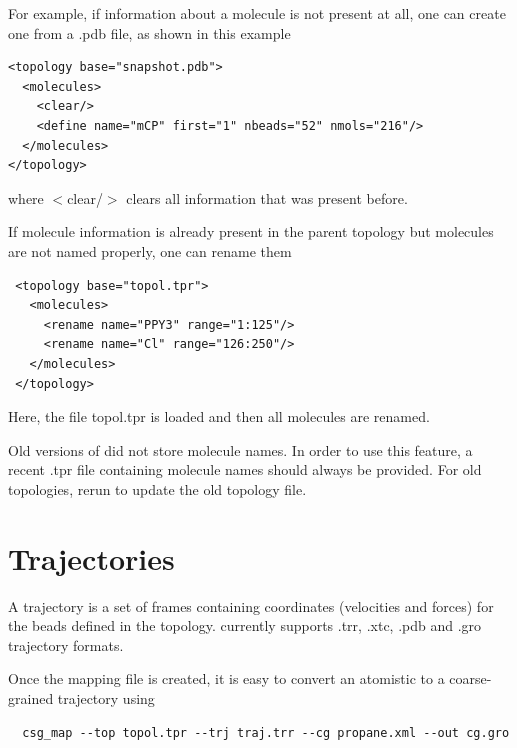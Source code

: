 For example, if information about a molecule is not present at all, one can create one from a .pdb file, as shown in this example
\begin{lstlisting}
<topology base="snapshot.pdb">
  <molecules>
    <clear/>
    <define name="mCP" first="1" nbeads="52" nmols="216"/>
  </molecules>
</topology>
\end{lstlisting}
where $<$clear/$>$ clears all information that was present before.

If molecule information is already present in the parent topology but molecules are not named properly, one can rename them
\begin{lstlisting}
 <topology base="topol.tpr">
   <molecules>
     <rename name="PPY3" range="1:125"/>
     <rename name="Cl" range="126:250"/>
   </molecules>
 </topology>
\end{lstlisting}
Here, the file topol.tpr is loaded and then all molecules are renamed.

 Old versions of \gromacs did not store molecule names. In order to use this feature, a recent .tpr file containing molecule names should always be provided. For old topologies, rerun \gromacs {} to update the old topology file.


\section{Trajectories}
A trajectory is a set of frames containing coordinates (velocities and forces) for the beads defined in the topology. \votca currently supports .trr, .xtc, .pdb and .gro trajectory formats.

Once the mapping file is created, it is easy to convert an atomistic to a coarse-grained trajectory using 
\begin{verbatim}
  csg_map --top topol.tpr --trj traj.trr --cg propane.xml --out cg.gro
\end{verbatim}




